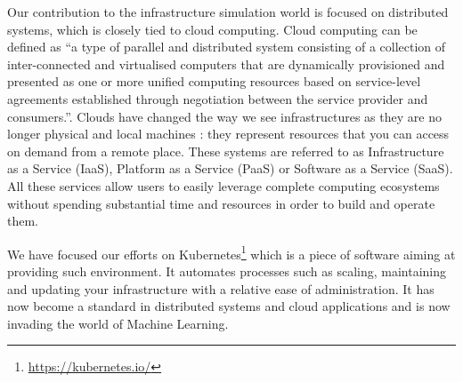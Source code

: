 \documentclass[12pt, a4paper]{memoir}
\begin{document}
Our contribution to the infrastructure simulation world is focused on
distributed systems, which is closely tied to cloud computing. Cloud computing
can be defined as ``a  type  of  parallel  and  distributed system  consisting
of  a collection  of  inter-connected  and  virtualised  computers  that  are
dynamically provisioned and presented as one or more unified computing
resources based on service-level  agreements  established  through negotiation
between  the  service  provider  and consumers.''\cite{4637675}. Clouds have
changed the way we see infrastructures as they are no longer physical and local
machines : they represent resources that you can access on demand from a remote
place.  These systems are referred to as Infrastructure as a Service (IaaS),
Platform as a Service (PaaS) or Software as a Service (SaaS). All these
services allow users to easily leverage complete computing ecosystems without
spending substantial time and resources in order to build and operate them.

We have focused our efforts on
Kubernetes\footnote{\url{https://kubernetes.io/}} which is a piece of software
aiming at providing such environment. It automates processes such as scaling,
maintaining and updating your infrastructure with a relative ease of
administration. It has now become a standard in distributed systems and cloud
applications and is now invading the world of Machine Learning. %



%
%
%
\end{document}
